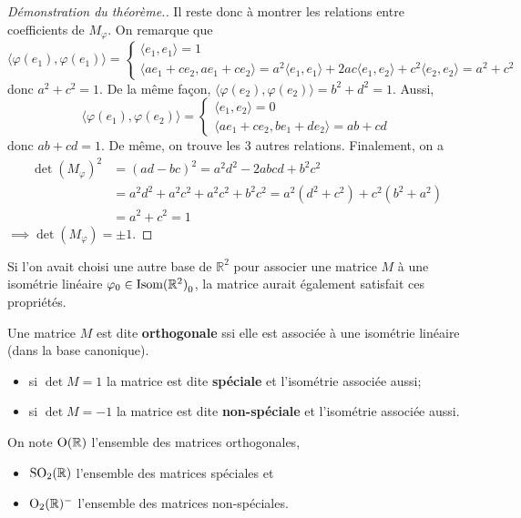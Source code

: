 \documentclass{book}
\numberwithin{equation}{section}
\renewcommand{\phi}{\varphi}
\providecommand{\plan}{{\mathbb R^2}}
\providecommand{\isom}{{\textnormal{Isom}(\plan)}}
\providecommand{\isomo}{{\isom_0}}
\providecommand{\mortho}[1]{{\textnormal{O}(#1)}}
\providecommand{\morthoR}{\mortho{\mathbb R}}
\providecommand{\mspec}[1]{{\textnormal{SO}_2(#1)}}
\providecommand{\mnspec}[1]{{\textnormal{O}_2(#1)^-}}
\providecommand{\mspecR}{\mspec{\mathbb R}}
\providecommand{\mnspecR}{\mnspec{\mathbb R}}
\providecommand{\scalaire}[1]{{\langle#1\rangle}}
\begin{document}
\begin{proof}[Démonstration du théorème.]
	Il reste donc à montrer les relations entre coefficients de $M_\phi$. On remarque que
	\begin{equation*}
		\scalaire{\phi(e_1), \phi(e_1)} =
		\begin{cases}
			\scalaire{e_1, e_1} = 1\\
			\scalaire{ae_1 + ce_2, ae_1 + ce_2} = a^2\scalaire{e_1, e_1} + 2ac\scalaire{e_1, e_2} + c^2\scalaire{e_2, e_2} = a^2 + c^2
		\end{cases}
	\end{equation*}
	donc $a^2 + c^2 = 1$. De la même façon, $\scalaire{\phi(e_2), \phi(e_2)} = b^2 + d^2 = 1$. Aussi,
	\begin{equation*}
		\scalaire{\phi(e_1), \phi(e_2)} =
		\begin{cases}
			\scalaire{e_1, e_2} = 0\\
			\scalaire{ae_1 + ce_2, be_1 + de_2} = ab + cd
		\end{cases}
	\end{equation*}
	donc $ab + cd = 1$. De même, on trouve les 3 autres relations. Finalement, on a
	\begin{align*}
		\det(M_\phi)^2 &= (ad - bc)^2 = a^2d^2 - 2abcd + b^2c^2\\
		&= a^2d^2 + a^2c^2 + a^2c^2 + b^2c^2 = a^2(d^2 + c^2) + c^2(b^2 + a^2)\\
		&= a^2 + c^2 = 1
	\end{align*}
	$\implies \det(M_\phi) = \pm 1$.
\end{proof}

\begin{remark}
	Si l'on avait choisi une autre base de $\plan$ pour associer une matrice $M$ à une isométrie linéaire $\phi_0 \in \isomo$, la matrice aurait également satisfait ces propriétés.
\end{remark}

\begin{defn}
	Une matrice $M$ est dite \textbf{orthogonale} ssi elle est associée à une isométrie linéaire (dans la base canonique).
	\begin{itemize}
		\item si $\det M = 1$ la matrice est dite \textbf{spéciale} et l'isométrie associée aussi;
		\item si $\det M = -1$ la matrice est dite \textbf{non-spéciale} et l'isométrie associée aussi.		
	\end{itemize}
	On note $\morthoR$ l'ensemble des matrices orthogonales,
	\begin{itemize}
		\item $\mspecR$ l'ensemble des matrices spéciales et
		\item $\mnspecR$ l'ensemble des matrices non-spéciales.
	\end{itemize}
\end{defn}
\end{document}
